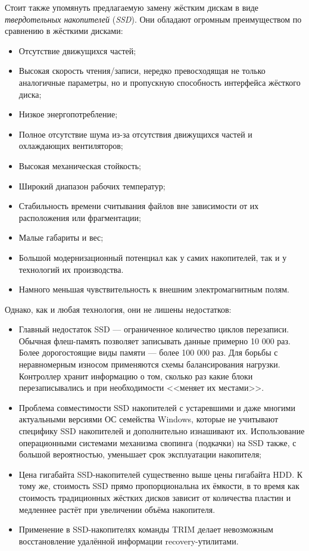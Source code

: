 Стоит также упомянуть предлагаемую замену жёстким дискам в виде \emph{твердотельных накопителей} (\emph{SSD}).
Они обладают огромным преимуществом по сравнению в жёсткими дисками:
\begin{itemize}
 \item Отсутствие движущихся частей;
 \item Высокая скорость чтения/записи, нередко превосходящая не только аналогичные параметры, но и пропускную способность интерфейса жёсткого диска;
 \item Низкое энергопотребление;
 \item Полное отсутствие шума из-за отсутствия движущихся частей и охлаждающих вентиляторов;
 \item Высокая механическая стойкость;
 \item Широкий диапазон рабочих температур;
 \item Стабильность времени считывания файлов вне зависимости от их расположения или фрагментации;
 \item Малые габариты и вес;
 \item Большой модернизационный потенциал как у самих накопителей, так и у технологий их производства.
 \item Намного меньшая чувствительность к внешним электромагнитным полям.
\end{itemize}
Однако, как и любая технология, они не лишены недостатков:
\begin{itemize}
 \item Главный недостаток SSD --- ограниченное количество циклов перезаписи.
  Обычная флеш-память позволяет записывать данные примерно 10 000 раз.
  Более дорогостоящие виды памяти --- более 100 000 раз.
  Для борьбы с неравномерным износом применяются схемы балансирования нагрузки.
  Контроллер хранит информацию о том, сколько раз какие блоки перезаписывались и при необходимости <<меняет их местами>>.
 \item Проблема совместимости SSD накопителей с устаревшими и даже многими актуальными версиями ОС семейства \foreignlanguage{english}{Windows}, которые не учитывают специфику SSD накопителей и дополнительно изнашивают их.
  Использование операционными системами механизма свопинга (подкачки) на SSD также, с большой вероятностью, уменьшает срок эксплуатации накопителя;
 \item Цена гигабайта SSD-накопителей существенно выше цены гигабайта HDD.
  К тому же, стоимость SSD прямо пропорциональна их ёмкости, в то время как стоимость традиционных жёстких дисков зависит от количества пластин и медленнее растёт при увеличении объёма накопителя.
 \item Применение в SSD-накопителях команды TRIM делает невозможным восстановление удалённой информации recovery-утилитами.
\end{itemize}

